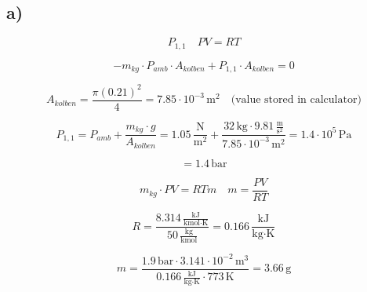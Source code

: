 

\subsection*{a)}

\[
P_{1,1} \quad PV = RT
\]

\[
-m_{kg} \cdot P_{amb} \cdot A_{kolben} + P_{1,1} \cdot A_{kolben} = 0
\]

\[
A_{kolben} = \frac{\pi (0.21)^2}{4} = 7.85 \cdot 10^{-3} \, \text{m}^2 \quad \text{(value stored in calculator)}
\]

\[
P_{1,1} = P_{amb} + \frac{m_{kg} \cdot g}{A_{kolben}} = 1.05 \, \frac{\text{N}}{\text{m}^2} + \frac{32 \, \text{kg} \cdot 9.81 \, \frac{\text{m}}{\text{s}^2}}{7.85 \cdot 10^{-3} \, \text{m}^2} = 1.4 \cdot 10^5 \, \text{Pa}
\]

\[
= 1.4 \, \text{bar}
\]

\[
m_{kg} \cdot PV = RTm \quad m = \frac{PV}{RT}
\]

\[
R = \frac{8.314 \, \frac{\text{kJ}}{\text{kmol} \cdot \text{K}}}{50 \, \frac{\text{kg}}{\text{kmol}}} = 0.166 \, \frac{\text{kJ}}{\text{kg} \cdot \text{K}}
\]

\[
m = \frac{1.9 \, \text{bar} \cdot 3.141 \cdot 10^{-2} \, \text{m}^3}{0.166 \, \frac{\text{kJ}}{\text{kg} \cdot \text{K}} \cdot 773 \, \text{K}} = 3.66 \, \text{g}
\]